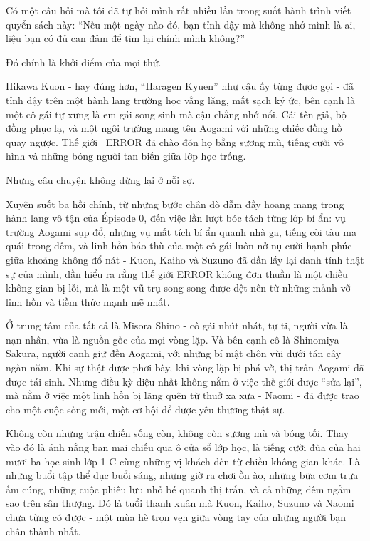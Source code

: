 \documentclass[main.tex]{subfiles}
\begin{document}
Có một câu hỏi mà tôi đã tự hỏi mình rất nhiều lần trong suốt hành trình viết quyển sách này: ``Nếu một ngày nào đó, bạn tỉnh dậy mà không nhớ mình là ai, liệu bạn có đủ can đảm để tìm lại chính mình không?''

Đó chính là khởi điểm của mọi thứ.

Hikawa Kuon - hay đúng hơn, ``Haragen Kyuen'' như cậu ấy từng được gọi - đã tỉnh dậy trên một hành lang trường học vắng lặng, mất sạch ký ức, bên cạnh là một cô gái tự xưng là em gái song sinh mà cậu chẳng nhớ nổi. Cái tên giả, bộ đồng phục lạ, và một ngôi trường mang tên Aogami với những chiếc đồng hồ quay ngược. Thế giới \hll\ ERROR đã chào đón họ bằng sương mù, tiếng cười vô hình và những bóng người tan biến giữa lớp học trống.

Nhưng câu chuyện không dừng lại ở nỗi sợ.

Xuyên suốt ba hồi chính, từ những bước chân dò dẫm đầy hoang mang trong hành lang vô tận của Épisode 0, đến việc lần lượt bóc tách từng lớp bí ẩn: vụ trường Aogami sụp đổ, những vụ mất tích bí ẩn quanh nhà ga, tiếng còi tàu ma quái trong đêm, và linh hồn báo thù của một cô gái luôn nở nụ cười hạnh phúc giữa khoảng không đổ nát - Kuon, Kaiho và Suzuno đã dần lấy lại danh tính thật sự của mình, dần hiểu ra rằng thế giới ERROR không đơn thuần là một chiều không gian bị lỗi, mà là một vũ trụ song song được dệt nên từ những mảnh vỡ linh hồn và tiềm thức mạnh mẽ nhất.

Ở trung tâm của tất cả là Misora Shino - cô gái nhút nhát, tự ti, người vừa là nạn nhân, vừa là nguồn gốc của mọi vòng lặp. Và bên cạnh cô là Shinomiya Sakura, người canh giữ đền Aogami, với những bí mật chôn vùi dưới tán cây ngàn năm. Khi sự thật được phơi bày, khi vòng lặp bị phá vỡ, thị trấn Aogami đã được tái sinh. Nhưng điều kỳ diệu nhất không nằm ở việc thế giới được ``sửa lại'', mà nằm ở việc một linh hồn bị lãng quên từ thuở xa xưa - Naomi - đã được trao cho một cuộc sống mới, một cơ hội để được yêu thương thật sự.

Không còn những trận chiến sống còn, không còn sương mù và bóng tối. Thay vào đó là ánh nắng ban mai chiếu qua ô cửa sổ lớp học, là tiếng cười đùa của hai mươi ba học sinh lớp 1-C cùng những vị khách đến từ chiều không gian khác. Là những buổi tập thể dục buổi sáng, những giờ ra chơi ồn ào, những bữa cơm trưa ấm cúng, những cuộc phiêu lưu nhỏ bé quanh thị trấn, và cả những đêm ngắm sao trên sân thượng. Đó là tuổi thanh xuân mà Kuon, Kaiho, Suzuno và Naomi chưa từng có được - một mùa hè trọn vẹn giữa vòng tay của những người bạn chân thành nhất.
\end{document}

